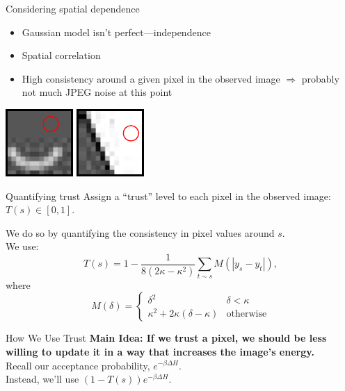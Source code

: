 \documentclass[10pt]{beamer}
\begin{document}
\begin{frame}{Considering spatial dependence}
\begin{itemize}
\item Gaussian model isn't perfect---independence
\item Spatial correlation \pause
\item High consistency around a given pixel in the observed image $\Rightarrow$ probably not much JPEG noise at this point
\end{itemize}

\begin{center}
\includegraphics[scale=1.7]{img/trust_ex1}
\hspace{4em}
\includegraphics[scale=1.7]{img/trust_ex2}
\end{center}

\end{frame}

\begin{frame}{Quantifying trust}
Assign a ``trust'' level to each pixel in the observed image: $T(s) \in [0, 1]$.

We do so by quantifying the consistency in pixel values around $s$.
\\[3ex]
\pause
We use:
\[ T(s) = 1 - \frac{1}{8(2\kappa-\kappa^2)} \sum_{t \sim s}M(|y_s-y_t|), \]
where
\[ M(\delta) = \begin{cases}
\delta^2 & \delta < \kappa \\
\kappa^2 + 2\kappa(\delta - \kappa) & \text{otherwise}

\end{cases} \]

\end{frame}

\begin{frame}{How We Use Trust}
\textbf{Main Idea: If we trust a pixel, we should be less willing to update it in a way that increases the image's energy.}
\\[2ex]
\pause
Recall our acceptance probability, $e^{-\beta\Delta\!H}$.
\\[2ex]
Instead, we'll use $\left(1-T(s)\right)e^{-\beta\Delta\!H}$.
\end{frame}
\end{document}
